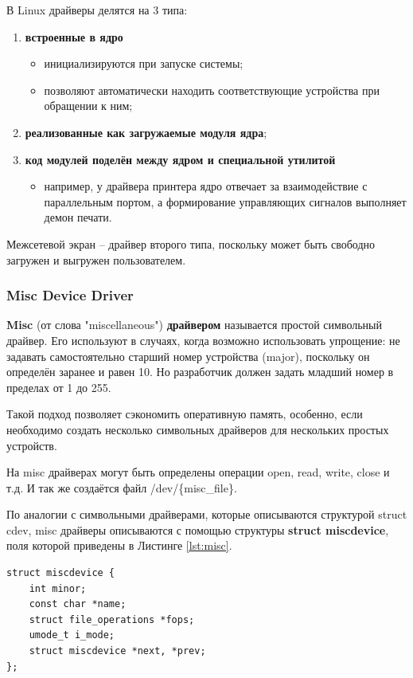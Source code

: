 В Linux драйверы делятся на 3 типа:
\begin{enumerate}
	\item \textbf{встроенные в ядро}
	\begin{itemize}
		\item инициализируются при запуске системы;
		
		\item позволяют автоматически находить соответствующие устройства при обращении к ним;
	\end{itemize}
	
	\item \textbf{реализованные как загружаемые модуля ядра};
	
	\item \textbf{код модулей поделён между ядром и специальной утилитой}
	\begin{itemize}
		\item например, у драйвера принтера ядро отвечает за взаимодействие с параллельным портом, а формирование управляющих сигналов выполняет демон печати.
	\end{itemize}
\end{enumerate}

Межсетевой экран -- драйвер второго типа, поскольку может быть свободно загружен и выгружен пользователем. \newline

\subsubsection{Misc Device Driver}
\textbf{Misc} (от слова "miscellaneous") \textbf{драйвером} называется простой символьный драйвер. Его используют в случаях, когда возможно использовать упрощение: не задавать самостоятельно старший номер устройства (major), поскольку он определён заранее и равен 10. Но разработчик должен задать младший номер в пределах от 1 до 255. \cite{2nd,misc}

Такой подход позволяет сэкономить оперативную память, особенно, если необходимо создать несколько символьных драйверов для нескольких простых устройств.

На misc драйверах могут быть определены операции open, read, write, close и т.д. И так же создаётся файл /dev/\{misc\_file\}.

По аналогии с символьными драйверами, которые описываются структурой struct cdev, misc драйверы описываются с помощью структуры \textbf{struct miscdevice}, поля которой приведены в Листинге \ref{lst:misc}.
\begin{lstlisting}[caption = {struct miscdevice}, label=lst:misc]
struct miscdevice {
	int minor;
	const char *name;
	struct file_operations *fops;
	umode_t i_mode;
	struct miscdevice *next, *prev;
};
\end{lstlisting}

